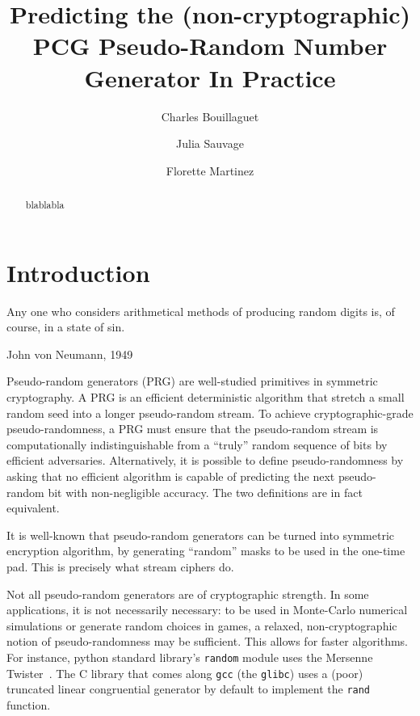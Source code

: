 \documentclass[submission,svgnames,journal=tosc]{iacrtrans}
\title[Predicting the PCG Pseudo-Random Number Generator in Practice]{Predicting the (non-cryptographic) PCG Pseudo-Random Number Generator In Practice}
\author{Charles Bouillaguet\inst{1} \and Julia Sauvage\inst{2} \and Florette Martinez\inst{3}}
\institute{%
University of Lille, France \\ 
\email{charles.bouillaguet@univ-lille.fr}
\and 
Sorbonne University \\
\email{julia.sauvage@etu.upmc.fr}
\and 
LIP6, CNRS, SU ? \\
\email{florette.martinez@lip6.fr}

}
\newcommand{\todo}[1]{\textcolor{red}{TODO:[#1]}}
\begin{document}
\maketitle


\begin{abstract}
  blablabla
\end{abstract}

\section{Introduction} %

\epigraph{Any one who considers arithmetical methods of producing random digits is, of course, in a state of sin.}{John von Neumann, 1949}


Pseudo-random generators (PRG) are well-studied primitives in symmetric
cryptography. A PRG is an efficient deterministic algorithm that stretch a small
random seed into a longer pseudo-random stream. To achieve cryptographic-grade
pseudo-randomness, a PRG must ensure that the pseudo-random stream is
computationally indistinguishable from a ``truly'' random sequence of bits by
efficient adversaries. Alternatively, it is possible to define pseudo-randomness
by asking that no efficient algorithm is capable of predicting the next
pseudo-random bit with non-negligible accuracy. The two definitions are in fact
equivalent.

It is well-known that pseudo-random generators can be turned into symmetric
encryption algorithm, by generating ``random'' masks to be used in the one-time
pad. This is precisely what stream ciphers do.

Not all pseudo-random generators are of cryptographic strength. In some
applications, it is not necessarily necessary: to be used in Monte-Carlo
numerical simulations or generate random choices in games, a relaxed,
non-cryptographic notion of pseudo-randomness may be sufficient. This allows for
faster algorithms. For instance, \textsf{python} standard library's
\texttt{random} module uses the Mersenne Twister~\cite{MatsumotoN98}. The
\textsf{C} library that comes along \texttt{gcc} (the \texttt{glibc}) uses a
(poor) truncated linear congruential generator by default to implement the
\texttt{rand} function.
\end{document}

